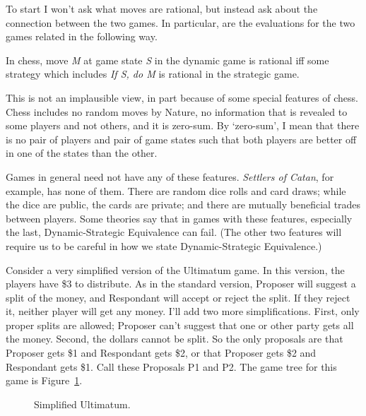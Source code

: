 \documentclass[
  10pt,
  letterpaper,
  DIV=11,
  numbers=noendperiod,
  twoside]{scrartcl}
\providecommand{\tightlist}{%
  \setlength{\itemsep}{0pt}\setlength{\parskip}{0pt}}\usepackage{longtable,booktabs,array}
\begin{document}
To start I won't ask what moves are rational, but instead ask about the
connection between the two games. In particular, are the evaluations for
the two games related in the following way.

\begin{description}
\tightlist
\item[Dynamic-Strategic Equivalance (for chess)]
In chess, move \emph{M} at game state \emph{S} in the dynamic game is
rational iff some strategy which includes \emph{If S, do M} is rational
in the strategic game.
\end{description}

This is not an implausible view, in part because of some special
features of chess. Chess includes no random moves by Nature, no
information that is revealed to some players and not others, and it is
zero-sum. By `zero-sum', I mean that there is no pair of players and
pair of game states such that both players are better off in one of the
states than the other.

Games in general need not have any of these features. \emph{Settlers of
Catan}, for example, has none of them. There are random dice rolls and
card draws; while the dice are public, the cards are private; and there
are mutually beneficial trades between players. Some theories say that
in games with these features, especially the last, Dynamic-Strategic
Equivalence can fail. (The other two features will require us to be
careful in how we state Dynamic-Strategic Equivalence.)

Consider a very simplified version of the Ultimatum game. In this
version, the players have \$3 to distribute. As in the standard version,
Proposer will suggest a split of the money, and Respondant will accept
or reject the split. If they reject it, neither player will get any
money. I'll add two more simplifications. First, only proper splits are
allowed; Proposer can't suggest that one or other party gets all the
money. Second, the dollars cannot be split. So the only proposals are
that Proposer gets \$1 and Respondant gets \$2, or that Proposer gets
\$2 and Respondant gets \$1. Call these Proposals P1 and P2. The game
tree for this game is Figure~\ref{fig-ultimatum}.

\begin{figure}


\caption{\label{fig-ultimatum}Simplified Ultimatum.}

\end{figure}%
\end{document}
